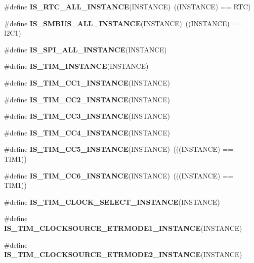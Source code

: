 \begin{DoxyCompactItemize}
\#define {\bfseries I\+S\+\_\+\+R\+T\+C\+\_\+\+A\+L\+L\+\_\+\+I\+N\+S\+T\+A\+N\+CE}(I\+N\+S\+T\+A\+N\+CE)~((I\+N\+S\+T\+A\+N\+CE) == R\+TC)
\item 
\mbox{\label{group___exported__macro_gaf492fcfe71eab8d1dadf4d837b840af6}} 
\#define {\bfseries I\+S\+\_\+\+S\+M\+B\+U\+S\+\_\+\+A\+L\+L\+\_\+\+I\+N\+S\+T\+A\+N\+CE}(I\+N\+S\+T\+A\+N\+CE)~((I\+N\+S\+T\+A\+N\+CE) == I2\+C1)
\item 
\#define {\bfseries I\+S\+\_\+\+S\+P\+I\+\_\+\+A\+L\+L\+\_\+\+I\+N\+S\+T\+A\+N\+CE}(I\+N\+S\+T\+A\+N\+CE)
\item 
\#define {\bfseries I\+S\+\_\+\+T\+I\+M\+\_\+\+I\+N\+S\+T\+A\+N\+CE}(I\+N\+S\+T\+A\+N\+CE)
\item 
\#define {\bfseries I\+S\+\_\+\+T\+I\+M\+\_\+\+C\+C1\+\_\+\+I\+N\+S\+T\+A\+N\+CE}(I\+N\+S\+T\+A\+N\+CE)
\item 
\#define {\bfseries I\+S\+\_\+\+T\+I\+M\+\_\+\+C\+C2\+\_\+\+I\+N\+S\+T\+A\+N\+CE}(I\+N\+S\+T\+A\+N\+CE)
\item 
\#define {\bfseries I\+S\+\_\+\+T\+I\+M\+\_\+\+C\+C3\+\_\+\+I\+N\+S\+T\+A\+N\+CE}(I\+N\+S\+T\+A\+N\+CE)
\item 
\#define {\bfseries I\+S\+\_\+\+T\+I\+M\+\_\+\+C\+C4\+\_\+\+I\+N\+S\+T\+A\+N\+CE}(I\+N\+S\+T\+A\+N\+CE)
\item 
\mbox{\label{group___exported__macro_ga792dfa11e701c0e2dad3ed9e6b32fdff}} 
\#define {\bfseries I\+S\+\_\+\+T\+I\+M\+\_\+\+C\+C5\+\_\+\+I\+N\+S\+T\+A\+N\+CE}(I\+N\+S\+T\+A\+N\+CE)~(((I\+N\+S\+T\+A\+N\+CE) == T\+I\+M1))
\item 
\mbox{\label{group___exported__macro_ga41866b98e60d00f42889a97271d2fefa}} 
\#define {\bfseries I\+S\+\_\+\+T\+I\+M\+\_\+\+C\+C6\+\_\+\+I\+N\+S\+T\+A\+N\+CE}(I\+N\+S\+T\+A\+N\+CE)~(((I\+N\+S\+T\+A\+N\+CE) == T\+I\+M1))
\item 
\#define {\bfseries I\+S\+\_\+\+T\+I\+M\+\_\+\+C\+L\+O\+C\+K\+\_\+\+S\+E\+L\+E\+C\+T\+\_\+\+I\+N\+S\+T\+A\+N\+CE}(I\+N\+S\+T\+A\+N\+CE)
\item 
\#define {\bfseries I\+S\+\_\+\+T\+I\+M\+\_\+\+C\+L\+O\+C\+K\+S\+O\+U\+R\+C\+E\+\_\+\+E\+T\+R\+M\+O\+D\+E1\+\_\+\+I\+N\+S\+T\+A\+N\+CE}(I\+N\+S\+T\+A\+N\+CE)
\item 
\#define {\bfseries I\+S\+\_\+\+T\+I\+M\+\_\+\+C\+L\+O\+C\+K\+S\+O\+U\+R\+C\+E\+\_\+\+E\+T\+R\+M\+O\+D\+E2\+\_\+\+I\+N\+S\+T\+A\+N\+CE}(I\+N\+S\+T\+A\+N\+CE)

\end{DoxyCompactItemize}
